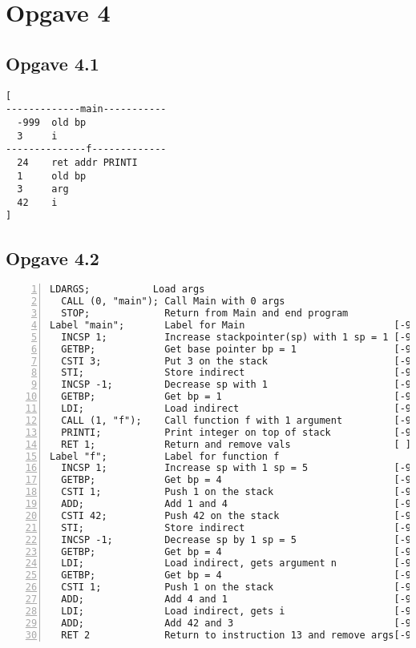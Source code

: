 \documentclass[11pt,a4paper]{article}
\begin{document}
\section{Opgave 4}
\subsection{Opgave 4.1}
\begin{verbatim}
[
-------------main-----------
  -999  old bp
  3     i
--------------f-------------
  24    ret addr PRINTI
  1     old bp
  3     arg
  42    i
]
\end{verbatim}
\subsection{Opgave 4.2}
\begin{Verbatim}[numbers=left]
  LDARGS;           Load args
  CALL (0, "main"); Call Main with 0 args
  STOP;             Return from Main and end program
Label "main";       Label for Main                          [-999]
  INCSP 1;          Increase stackpointer(sp) with 1 sp = 1 [-999 0]
  GETBP;            Get base pointer bp = 1                 [-999 0 1]
  CSTI 3;           Put 3 on the stack                      [-999 0 1 3]
  STI;              Store indirect                          [-999 3 3]
  INCSP -1;         Decrease sp with 1                      [-999 3]
  GETBP;            Get bp = 1                              [-999 3 1]
  LDI;              Load indirect                           [-999 3 3]
  CALL (1, "f");    Call function f with 1 argument         [-999 3 13 1 3]
  PRINTI;           Print integer on top of stack           [-999 3 45]
  RET 1;            Return and remove vals                  [ ]
Label "f";          Label for function f
  INCSP 1;          Increase sp with 1 sp = 5               [-999 3 13 1 3 0]
  GETBP;            Get bp = 4                              [-999 3 13 1 3 0 5]
  CSTI 1;           Push 1 on the stack                     [-999 3 13 1 3 0 5 1]
  ADD;              Add 1 and 4                             [-999 3 13 1 3 0 6]
  CSTI 42;          Push 42 on the stack                    [-999 3 13 1 3 0 6 42]
  STI;              Store indirect                          [-999 3 13 1 3 42 42]
  INCSP -1;         Decrease sp by 1 sp = 5                 [-999 3 13 1 3 42]
  GETBP;            Get bp = 4                              [-999 3 13 1 3 42 4]
  LDI;              Load indirect, gets argument n          [-999 3 13 1 3 42 3]
  GETBP;            Get bp = 4                              [-999 3 13 1 3 42 3 4]
  CSTI 1;           Push 1 on the stack                     [-999 3 13 1 3 42 3 4 1]
  ADD;              Add 4 and 1                             [-999 3 13 1 3 42 3 5]
  LDI;              Load indirect, gets i                   [-999 3 13 1 3 42 3 42]
  ADD;              Add 42 and 3                            [-999 3 13 1 3 42 45]
  RET 2             Return to instruction 13 and remove args[-999 3 45]
\end{Verbatim}
\end{document}
